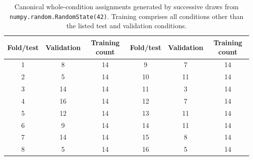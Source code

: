 \begin{table}[htbp]
\centering
\caption{Canonical whole-condition assignments generated by successive
draws from \texttt{numpy.random.RandomState(42)}. Training comprises all
conditions other than the listed test and validation conditions.}
\label{tab:supp-logo-assignments}
\begin{tabular}{@{}ccc@{\qquad}ccc@{}}
\toprule
Fold/test & Validation & Training count & Fold/test & Validation & Training count \\
\midrule
1 & 8 & 14 & 9 & 7 & 14 \\
2 & 5 & 14 & 10 & 11 & 14 \\
3 & 14 & 14 & 11 & 3 & 14 \\
4 & 16 & 14 & 12 & 7 & 14 \\
5 & 12 & 14 & 13 & 11 & 14 \\
6 & 9 & 14 & 14 & 11 & 14 \\
7 & 14 & 14 & 15 & 8 & 14 \\
8 & 5 & 14 & 16 & 5 & 14 \\
\bottomrule
\end{tabular}
\end{table}
